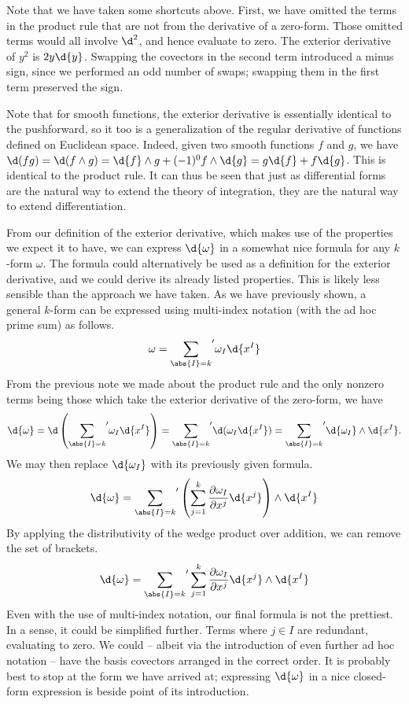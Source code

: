 \documentclass[a4paper,12pt]{article}
\begin{document}
Note that we have taken some shortcuts above.
First, we have omitted the terms in the product rule that are not from the derivative of a zero-form.
Those omitted terms would all involve $\d^2$, and hence evaluate to zero.
The exterior derivative of $y^2$ is $2y \d{y}$.
Swapping the covectors in the second term introduced a minus sign, since we performed an odd number of swaps; swapping them in the first term preserved the sign.

Note that for smooth functions, the exterior derivative is essentially identical to the pushforward, so it too is a generalization of the regular derivative of functions defined on Euclidean space.
Indeed, given two smooth functions $f$ and $g$, we have $\d(fg) = \d(f \wedge g) = \d{f} \wedge g + (-1)^0 f \wedge \d{g} = g\d{f} + f\d{g}$.
This is identical to the product rule.
It can thus be seen that just as differential forms are the natural way to extend the theory of integration, they are the natural way to extend differentiation.

From our definition of the exterior derivative, which makes use of the properties we expect it to have, we can express $\d{\omega}$ in a somewhat nice formula for any $k$-form $\omega$.
The formula could alternatively be used as a definition for the exterior derivative, and we could derive its already listed properties.
This is likely less sensible than the approach we have taken.
As we have previously shown, a general $k$-form can be expressed using multi-index notation (with the ad hoc prime sum) as follows.
\begin{equation*}
    \omega = {\sum_{\abs{I}=k}}' \omega_I \d{x^I}
\end{equation*}
From the previous note we made about the product rule and the only nonzero terms being those which take the exterior derivative of the zero-form, we have
\begin{equation*}
    \d{\omega} = \d \left({\sum_{\abs{I}=k}}' \omega_I \d{x^I}\right) = {\sum_{\abs{I}=k}}' \d(\omega_I \d{x^I}) = {\sum_{\abs{I}=k}}' \d{\omega_I} \wedge \d{x^I}.
\end{equation*}
We may then replace $\d{\omega_I}$ with its previously given formula.
\begin{equation*}
    \d{\omega} = {\sum_{\abs{I}=k}}' \left( \sum_{j=1}^{k} \frac{\partial \omega_I}{\partial x^j} \d{x^j} \right) \wedge \d{x^I}
\end{equation*}
By applying the distributivity of the wedge product over addition, we can remove the set of brackets.
\begin{equation*}
    \d{\omega} = {\sum_{\abs{I}=k}}' \sum_{j=1}^{k} \frac{\partial \omega_I}{\partial x^j} \d{x^j} \wedge \d{x^I}
\end{equation*}
Even with the use of multi-index notation, our final formula is not the prettiest.
In a sense, it could be simplified further.
Terms where $j \in I$ are redundant, evaluating to zero.
We could -- albeit via the introduction of even further ad hoc notation -- have the basis covectors arranged in the correct order.
It is probably best to stop at the form we have arrived at; expressing $\d{\omega}$ in a nice closed-form expression is beside point of its introduction.
\end{document}
